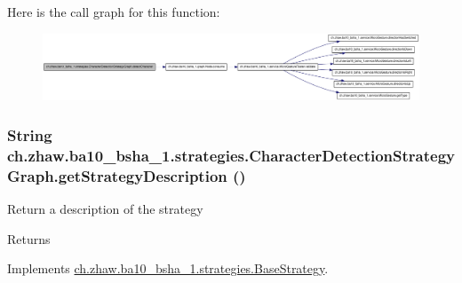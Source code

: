 Here is the call graph for this function:\nopagebreak
\begin{figure}[H]
\begin{center}
\leavevmode
\includegraphics[width=420pt]{classch_1_1zhaw_1_1ba10__bsha__1_1_1strategies_1_1CharacterDetectionStrategyGraph_af5d1202b6a9878b247cf4c5176102dd5_cgraph}
\end{center}
\end{figure}
\hypertarget{classch_1_1zhaw_1_1ba10__bsha__1_1_1strategies_1_1CharacterDetectionStrategyGraph_a29a9028d4b5f045527297dc35f4155de}{
\subsubsection[{getStrategyDescription}]{\setlength{\rightskip}{0pt plus 5cm}String ch.zhaw.ba10\_\-bsha\_\-1.strategies.CharacterDetectionStrategyGraph.getStrategyDescription ()}}
\label{classch_1_1zhaw_1_1ba10__bsha__1_1_1strategies_1_1CharacterDetectionStrategyGraph_a29a9028d4b5f045527297dc35f4155de}
Return a description of the strategy

\begin{DoxyReturn}{Returns}

\end{DoxyReturn}


Implements \hyperlink{classch_1_1zhaw_1_1ba10__bsha__1_1_1strategies_1_1BaseStrategy_a75fdb36932ad701f6375cc1fe718056b}{ch.zhaw.ba10\_\-bsha\_\-1.strategies.BaseStrategy}.


